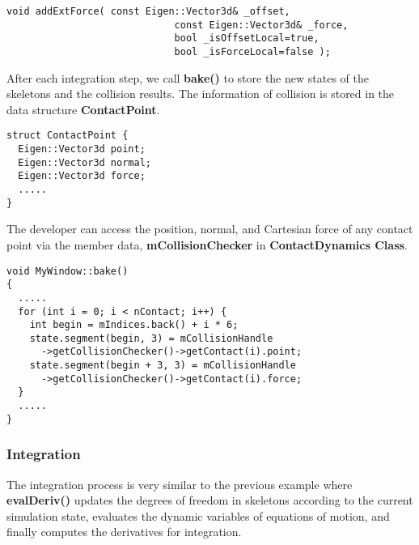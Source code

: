 \ttfamily
\begin{lstlisting}[caption=BodyNodeDynamics.h]
void addExtForce( const Eigen::Vector3d& _offset, 
                             const Eigen::Vector3d& _force, 
                             bool _isOffsetLocal=true, 
                             bool _isForceLocal=false );
\end{lstlisting}
\rmfamily

After each integration step, we call \textbf{bake()} to store the new
states of the skeletons and the collision results. The information of
collision is stored in the data structure \textbf{ContactPoint}.
\ttfamily
\begin{lstlisting}[caption=CollisionSkeleton.h]
struct ContactPoint {
  Eigen::Vector3d point;
  Eigen::Vector3d normal;
  Eigen::Vector3d force;
  .....
}
\end{lstlisting}
\rmfamily

The developer can access the position, normal, and Cartesian force of any
contact point via the member data, \textbf{mCollisionChecker} in
\textbf{ContactDynamics Class}.  

\ttfamily
\begin{lstlisting}[caption=MyWindow.cpp]
void MyWindow::bake()
{
  .....
  for (int i = 0; i < nContact; i++) {
    int begin = mIndices.back() + i * 6;
    state.segment(begin, 3) = mCollisionHandle
      ->getCollisionChecker()->getContact(i).point;
    state.segment(begin + 3, 3) = mCollisionHandle
      ->getCollisionChecker()->getContact(i).force;
  }
  .....
}
\end{lstlisting}
\rmfamily

\subsubsection{Integration}
The integration process is very similar to the previous example where
\textbf{evalDeriv()} updates the degrees of freedom in skeletons
according to the current simulation state, evaluates the dynamic
variables of equations of motion, and finally computes the derivatives
for integration.

